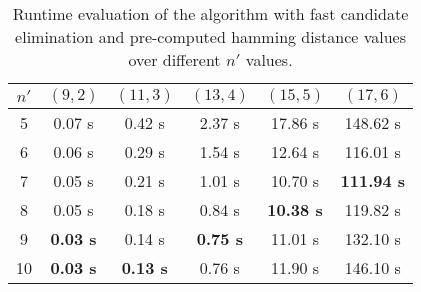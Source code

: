 \begin{table}[h] %
	\renewcommand{\arraystretch}{1.3}
	\label{tbl:nprime-speedup}
	\centering
	\begin{tabular}{|c|c|c|c|c|c|}
		\hline 
		\bfseries\boldmath $n'$ & 
		\bfseries\boldmath $(9,2)$ & 
		\bfseries\boldmath $(11,3)$ & 
		\bfseries\boldmath $(13,4)$ & 
		\bfseries\boldmath $(15,5)$ & 
		\bfseries\boldmath $(17,6)$ \\
		\hline
			5	& 	0.07 s			& 	0.42 s 			&	2.37 s			&	17.86 s				&	148.62 s\\
			6	& 	0.06 s			& 	0.29 s			& 	1.54 s			&	12.64 s				&	116.01 s\\
			7	& 	0.05 s			& 	0.21 s			& 	1.01 s			&	10.70 s				&	\textbf{111.94 s}\\
			8	& 	0.05 s			&	0.18 s			& 	0.84 s			&	\textbf{10.38 s}	&	119.82 s\\
			9	& 	\textbf{0.03 s} 			& 	0.14 s			& 	\textbf{0.75 s}	&	11.01 s				&	132.10 s\\
			10	& 	\textbf{0.03 s} &	\textbf{0.13 s}	& 	0.76 s			&	11.90 s				&	146.10 s\\
		\hline\end{tabular}
	\caption{Runtime evaluation of the algorithm with fast candidate elimination and pre-computed hamming distance values over different $n'$ values.}
\end{table}